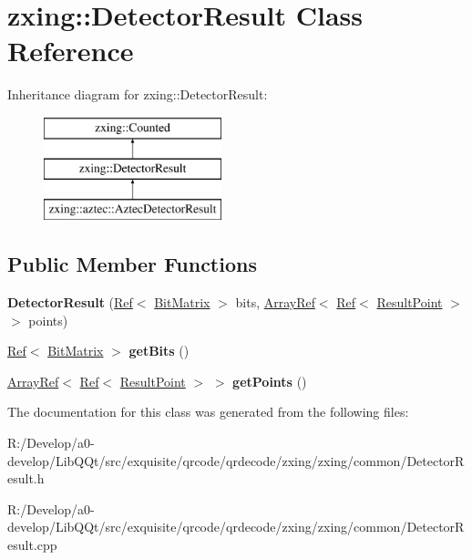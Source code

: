 \hypertarget{classzxing_1_1_detector_result}{}\section{zxing\+:\+:Detector\+Result Class Reference}
\label{classzxing_1_1_detector_result}
Inheritance diagram for zxing\+:\+:Detector\+Result\+:\begin{figure}[H]
\begin{center}
\leavevmode
\includegraphics[height=3.000000cm]{classzxing_1_1_detector_result}
\end{center}
\end{figure}
\subsection*{Public Member Functions}
\begin{DoxyCompactItemize}
\item 
\mbox{\label{classzxing_1_1_detector_result_a421a5efcb82c697abc33ab158f9e314a}} 
{\bfseries Detector\+Result} (\mbox{\hyperlink{classzxing_1_1_ref}{Ref}}$<$ \mbox{\hyperlink{classzxing_1_1_bit_matrix}{Bit\+Matrix}} $>$ bits, \mbox{\hyperlink{classzxing_1_1_array_ref}{Array\+Ref}}$<$ \mbox{\hyperlink{classzxing_1_1_ref}{Ref}}$<$ \mbox{\hyperlink{classzxing_1_1_result_point}{Result\+Point}} $>$ $>$ points)
\item 
\mbox{\label{classzxing_1_1_detector_result_a443eef7c4a825235a438f3012a2b314d}} 
\mbox{\hyperlink{classzxing_1_1_ref}{Ref}}$<$ \mbox{\hyperlink{classzxing_1_1_bit_matrix}{Bit\+Matrix}} $>$ {\bfseries get\+Bits} ()
\item 
\mbox{\label{classzxing_1_1_detector_result_a00c44baf152ee35b8f8759e93be4a866}} 
\mbox{\hyperlink{classzxing_1_1_array_ref}{Array\+Ref}}$<$ \mbox{\hyperlink{classzxing_1_1_ref}{Ref}}$<$ \mbox{\hyperlink{classzxing_1_1_result_point}{Result\+Point}} $>$ $>$ {\bfseries get\+Points} ()
\end{DoxyCompactItemize}


The documentation for this class was generated from the following files\+:\begin{DoxyCompactItemize}
\item 
R\+:/\+Develop/a0-\/develop/\+Lib\+Q\+Qt/src/exquisite/qrcode/qrdecode/zxing/zxing/common/Detector\+Result.\+h\item 
R\+:/\+Develop/a0-\/develop/\+Lib\+Q\+Qt/src/exquisite/qrcode/qrdecode/zxing/zxing/common/Detector\+Result.\+cpp\end{DoxyCompactItemize}
